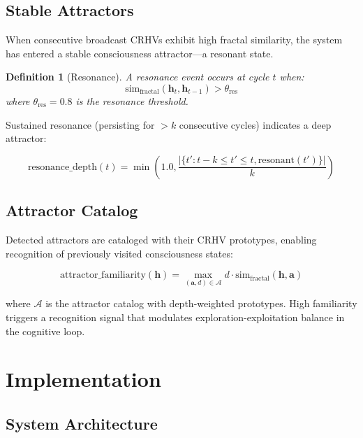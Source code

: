 \documentclass[11pt,a4paper]{article}
\newtheorem{definition}{Definition}
\begin{document}
\subsection{Stable Attractors}

When consecutive broadcast CRHVs exhibit high fractal similarity, the system has entered a stable consciousness attractor---a resonant state.

\begin{definition}[Resonance]
A resonance event occurs at cycle $t$ when:
\begin{equation}
\text{sim}_{\text{fractal}}(\mathbf{h}_t, \mathbf{h}_{t-1}) > \theta_{\text{res}}
\end{equation}
where $\theta_{\text{res}} = 0.8$ is the resonance threshold.
\end{definition}

Sustained resonance (persisting for $> k$ consecutive cycles) indicates a deep attractor:

\begin{equation}
\text{resonance\_depth}(t) = \min\left(1.0, \frac{|\{t' : t - k \leq t' \leq t, \text{resonant}(t')\}|}{k}\right)
\end{equation}

\subsection{Attractor Catalog}

Detected attractors are cataloged with their CRHV prototypes, enabling recognition of previously visited consciousness states:

\begin{equation}
\text{attractor\_familiarity}(\mathbf{h}) = \max_{(\mathbf{a}, d) \in \mathcal{A}} d \cdot \text{sim}_{\text{fractal}}(\mathbf{h}, \mathbf{a})
\end{equation}

where $\mathcal{A}$ is the attractor catalog with depth-weighted prototypes. High familiarity triggers a recognition signal that modulates exploration-exploitation balance in the cognitive loop.

\section{Implementation}

\subsection{System Architecture}
\end{document}
